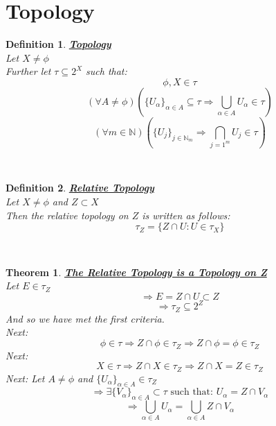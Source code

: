 \documentclass[12pt]{extarticle}
\theoremstyle{plain}
\newtheorem{thm}{Theorem}[section]
\theoremstyle{plain}
\theoremstyle{plain}
\theoremstyle{Definition}
\newtheorem{def.}{Definition}[section]
\theoremstyle{Definition}
\theoremstyle{plain}
\theoremstyle{plain}
\newcommand{\cut}[0]{\noindent\framebox[\linewidth]{\rule{\linewidth}{2pt}}\\}
\begin{document}
\section{Topology}

\begin{def.} \underline{\textbf{Topology}} \\
	Let $X \not = \phi$ \\ 
	Further let $\tau \subseteq 2^X$ such that: \\ 
	$$\phi,X \in \tau$$
	$$(\forall A \not = \phi)\left(\{U_\alpha\}_{\alpha \in A} \subseteq \tau \Rightarrow \bigcup_{\alpha \in A} U_\alpha \in \tau\right)$$
	$$(\forall m \in \mathbb{N})\left(\{U_j\}_{j\in \mathbb{N}_m} \Rightarrow \bigcap_{j=1^m} U_j \in \tau\right)$$
\end{def.}
\cut
\begin{def.} \underline{\textbf{Relative Topology}} \\
	Let $X \not = \phi$ and $Z \subset X$ \\ 
	Then the relative topology on $Z$ is written as follows: \\ 
	$$\tau_Z = \{Z \cap U : U \in \tau_X\}$$
\end{def.}
\cut
\begin{thm} \underline{\textbf{The Relative Topology is a Topology on Z}} \\
	Let $E \in \tau_Z$ \\
	$$\Rightarrow E = Z \cap U \subset Z$$
	$$\Rightarrow \tau_Z \subseteq 2^Z$$
	And so we have met the first criteria. \\ 
	Next: 
	$$\phi \in \tau \Rightarrow Z \cap \phi \in \tau_Z \Rightarrow Z \cap \phi = \phi \in \tau_Z$$
	Next: 
	$$X \in \tau \Rightarrow Z \cap X \in \tau_Z \Rightarrow Z \cap X = Z \in \tau_Z$$
	Next: 
	Let $A \not = \phi$ and $\{U_\alpha\}_{\alpha \in A} \in \tau_Z$ \\ 
	$$\Rightarrow \exists \{V_\alpha\}_{\alpha \in A} \subset \tau \text{ such that: } U_\alpha = Z \cap V_\alpha$$
	$$\Rightarrow \bigcup_{\alpha \in A} U_\alpha = \bigcup_{\alpha \in A} Z \cap V_\alpha$$
\end{thm}
\cut
\end{document}
